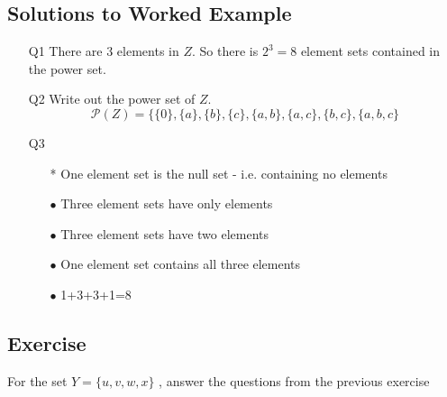 \documentclass[11pt,a4paper,titlepage,oneside,openany]{article}
\numberwithin{equation}{section}
\numberwithin{algorithm}{section}
\numberwithin{figure}{section}
\numberwithin{table}{section}
\begin{document}
\subsection*{Solutions to Worked Example}

\begin{itemize}


\item[Q1] There are 3 elements in $Z$. So there is $2^3 = 8$ element sets contained in the power set.

\item[Q2] Write out the power set of $Z$.
\[ \mathcal{P}(Z) = \{ \{0\}, \{a\}, \{b\}, \{c\}, \{a,b\}, \{a,c\}, \{b,c\}, \{a,b,c\} \]

\item[Q3]
\begin{itemize}
\item[*] One element set is the null set - i.e. containing no
elements \item[$\bullet$] Three element sets have only elements \item[$\bullet$]
Three element sets have two elements \item[$\bullet$] One element set
contains all three elements \item[$\bullet$] 1+3+3+1=8
\end{itemize}
\end{itemize}
\subsection*{Exercise}
For the set $Y = \{u,v,w,x\}$ , answer the questions from the
previous exercise
\end{document}

